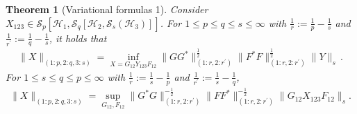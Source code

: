 \documentclass[11pt]{article}
\newcommand{\1}{\ensuremath{\mathbbm{1}}}
\theoremstyle{newdefinition}
\theoremstyle{newplain}
\newtheorem{theorem}[definition]{Theorem}
\theoremstyle{myplain}
\begin{document}
\begin{theorem}[Variational formulas 1] \label{cor:variationalFormula.2}
    Consider $X_{123}\in \mathcal{S}_p[\mathcal{H}_1,\mathcal{S}_q[\mathcal{H}_2,\mathcal{S}_s(\mathcal{H}_3)]]$. For $1\leq p\leq q\leq s\leq \infty$ with $\frac{1}{r}:=\frac{1}{p}-\frac{1}{s}$ and $ \frac{1}{r^\prime}:=\frac{1}{q}-\frac{1}{s}$, it holds that
  \begin{align}
\|X\|_{(1:p,2:q,3:s)} = \inf_{ X=G_{12}Y_{123}F_{12}}\|GG^*\|^{\frac{1}{2}}_{(1:r,2:r^\prime)}\|F^*F\|^{\frac{1}{2}}_{(1:r,2:r^\prime)}\|Y\|_s\,.
  \end{align}
For $1\leq s\leq q\leq p\leq \infty$ with $\frac{1}{r}:=\frac{1}{s}-\frac{1}{p}$ and $\frac{1}{r^\prime}:=\frac{1}{s}-\frac{1}{q}$, 
  \begin{align}
\|X\|_{(1:p,2:q,3:s)} = \sup_{G_{12},F_{12}}\|G^*G\|^{-\frac{1}{2}}_{(1:r,2:r^\prime)}\|FF^*\|^{-\frac{1}{2}}_{(1:r,2:r^\prime)}\|G_{12}X_{123}F_{12}\|_s.
  \end{align}  
\end{theorem}
\end{document}
